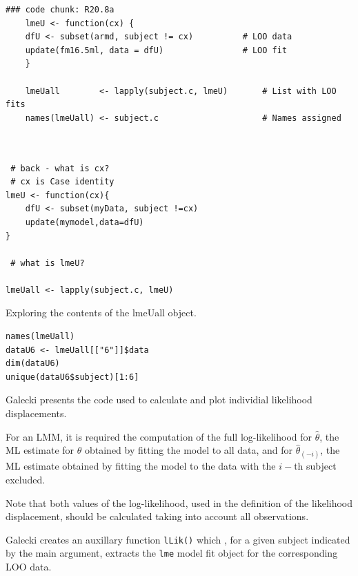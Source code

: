 \documentclass[a4paper,12pt]{article}
\begin{document}
\begin{framed}
	\begin{verbatim}	
### code chunk: R20.8a
	lmeU <- function(cx) { 
	dfU <- subset(armd, subject != cx)          # LOO data 
	update(fm16.5ml, data = dfU)                # LOO fit 
	}
	
	lmeUall        <- lapply(subject.c, lmeU)       # List with LOO fits
	names(lmeUall) <- subject.c                     # Names assigned          
	
	\end{verbatim}
\end{framed}

\begin{framed}
\begin{verbatim}

 # back - what is cx?
 # cx is Case identity
lmeU <- function(cx){
	dfU <- subset(myData, subject !=cx)
	update(mymodel,data=dfU)
}

 # what is lmeU?

lmeUall <- lapply(subject.c, lmeU)
\end{verbatim}
\end{framed}
Exploring the contents of the lmeUall object.
\begin{framed}
\begin{verbatim}
names(lmeUall)
dataU6 <- lmeUall[["6"]]$data
dim(dataU6)
unique(dataU6$subject)[1:6]
\end{verbatim}
\end{framed}


Galecki presents the code used to calculate and plot individial likelihood displacements.

For an LMM, it is required the computation of the full log-likelihood for \textbf{$\hat{\theta}$}, the ML estimate for 
\textbf{$\theta$} obtained by fitting the model to all data, and for \textbf{$\hat{\theta}_(-i)$}, the ML estimate obtained
by fitting the model to the data with the $i-$th subject excluded.

Note that both values of the log-likelihood, used in the definition of the likelihood displacement, should be 
calculated taking into account all observations.



Galecki creates an auxillary function \texttt{lLik()} which , for a given subject indicated by the main argument, extracts the \texttt{lme} model fit object for the
corresponding LOO data.
\end{document}

